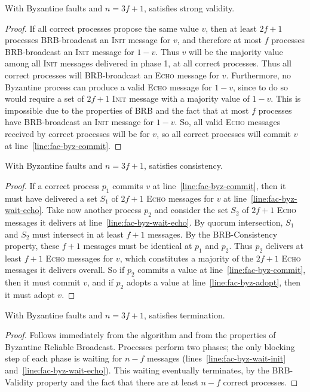\begin{lemma}\label{lem:byz-round-validity}
    With Byzantine faults and $n=3f+1$,  satisfies strong validity.
\end{lemma}
\begin{proof}
    If all correct processes propose the same value $v$, then at least $2f+1$ processes BRB-broadcast an \textsc{Init} message for $v$, and therefore at most $f$ processes BRB-broadcast an \textsc{Init} message for $1-v$. Thus $v$ will be the majority value among all \textsc{Init} messages delivered in phase 1, at all correct processes. Thus all correct processes will BRB-broadcast an \textsc{Echo} message for $v$. Furthermore, no Byzantine process can produce a valid \textsc{Echo} message for $1-v$, since to do so would require a set of $2f+1$ \textsc{Init} message with a majority value of $1-v$. This is impossible due to the properties of BRB and the fact that at most $f$ processes have BRB-broadcast an \textsc{Init} message for $1-v$.
    So, all valid \textsc{Echo} messages received by correct processes will be for $v$, so all correct processes will commit $v$ at line~\ref{line:fac-byz-commit}.
\end{proof}

\begin{lemma}
    With Byzantine faults and $n=3f+1$,  satisfies consistency.
\end{lemma}
\begin{proof}
    If a correct process $p_1$ commits $v$ at line~\ref{line:fac-byz-commit}, then it must have delivered a set $S_1$ of $2f+1$ \textsc{Echo} messages for $v$ at line~\ref{line:fac-byz-wait-echo}. Take now another process $p_2$ and consider the set $S_2$ of $2f+1$ \textsc{Echo} messages it delivers at line~\ref{line:fac-byz-wait-echo}. By quorum intersection, $S_1$ and $S_2$ must intersect in at least $f+1$ messages. By the BRB-Consistency property, these $f+1$ messages must be identical at $p_1$ and $p_2$. Thus $p_2$ delivers at least $f+1$ \textsc{Echo} messages for $v$, which constitutes a majority of the $2f+1$ \textsc{Echo} messages it delivers overall. So if $p_2$ commits a value at line~\ref{line:fac-byz-commit}, then it must commit $v$, and if $p_2$ adopts a value at line~\ref{line:fac-byz-adopt}, then it must adopt $v$.
\end{proof}

\begin{lemma}
    With Byzantine faults and $n=3f+1$,  satisfies termination.
\end{lemma}
\begin{proof}
    Follows immediately from the algorithm and from the properties of Byzantine Reliable Broadcast. Processes perform two phases; the only blocking step of each phase is waiting for $n-f$ messages (lines~\ref{line:fac-byz-wait-init} and~\ref{line:fac-byz-wait-echo}). This waiting eventually terminates, by the BRB-Validity property and the fact that there are at least $n-f$ correct processes.
\end{proof}

